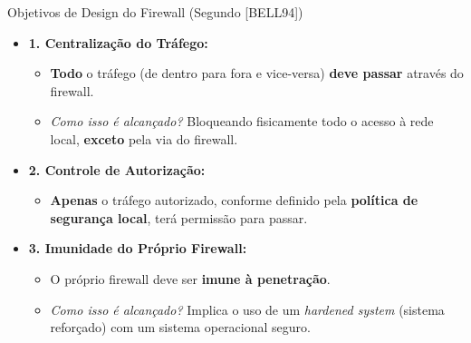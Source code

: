 \begin{frame}{Objetivos de Design do Firewall (Segundo [BELL94])}
    \begin{itemize}
        \item \textbf{1. Centralização do Tráfego:}
              \begin{itemize}
                  \item \textbf{Todo} o tráfego (de dentro para fora e vice-versa) \textbf{deve passar} através do firewall.
                  \item \textit{Como isso é alcançado?} Bloqueando fisicamente todo o acesso à rede local, \textbf{exceto} pela via do firewall.
              \end{itemize}

        \item \textbf{2. Controle de Autorização:}
              \begin{itemize}
                  \item \textbf{Apenas} o tráfego autorizado, conforme definido pela \textbf{política de segurança local}, terá permissão para passar.
              \end{itemize}

        \item \textbf{3. Imunidade do Próprio Firewall:}
              \begin{itemize}
                  \item O próprio firewall deve ser \textbf{imune à penetração}.
                  \item \textit{Como isso é alcançado?} Implica o uso de um \textit{hardened system} (sistema reforçado) com um sistema operacional seguro.
              \end{itemize}
    \end{itemize}
\end{frame}

